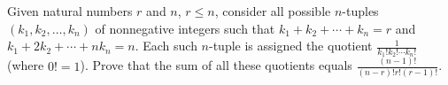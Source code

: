 \problem
Given natural numbers $r$ and $n$, $r \leq n$, consider all possible $n$-tuples
$(k_1, k_2, \ldots, k_n)$ of nonnegative integers such that
$k_1 + k_2 + \cdots + k_n = r$ and $k_1 + 2 k_2 + \cdots + n k_n = n$.
Each such $n$-tuple is assigned the quotient
$\frac{1}{k_1! k_2! \cdots k_n!}$ (where $0! = 1$).
Prove that the sum of all these quotients equals
\(
   \frac{(n - 1)!}{(n - r)! r! (r - 1)!}
\).
\solution
\endproblem
